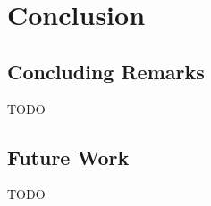 \chapter{Conclusion}

\section{Concluding Remarks}

TODO

\section{Future Work}

TODO


\cleardoublepage
